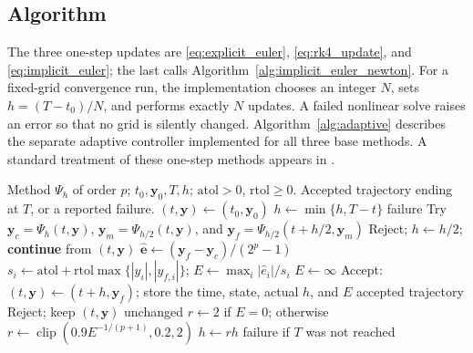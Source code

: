 \documentclass[11pt,a4paper]{article}
\theoremstyle{definition}
\theoremstyle{remark}
\begin{document}
\subsection{Algorithm}
The three one-step updates are \eqref{eq:explicit_euler},
\eqref{eq:rk4_update}, and \eqref{eq:implicit_euler}; the last calls
Algorithm~\ref{alg:implicit_euler_newton}. For a fixed-grid convergence
run, the implementation chooses an integer $N$, sets
$h=(T-t_0)/N$, and performs exactly $N$ updates. A failed nonlinear
solve raises an error so that no grid is silently changed.
Algorithm~\ref{alg:adaptive} describes the separate adaptive
controller implemented for all three base methods. A standard
treatment of these one-step methods appears in \cite{hairer1993}.

\begin{algorithm}[htbp]
\caption{Step-doubling adaptive integration}
\label{alg:adaptive}
\footnotesize
\begin{algorithmic}[1]
\Require Method $\Psi_h$ of order $p$; $t_0,\mathbf y_0,T,h$;
  $\mathrm{atol}>0$, $\mathrm{rtol}\geq0$.
\Ensure Accepted trajectory ending at $T$, or a reported failure.
\State $(t,\mathbf y)\gets(t_0,\mathbf y_0)$
    \State $h\gets\min\{h,T-t\}$
        \State \Return failure
    \EndIf
    \State Try $\mathbf y_c=\Psi_h(t,\mathbf y)$,
      $\mathbf y_m=\Psi_{h/2}(t,\mathbf y)$, and
      $\mathbf y_f=\Psi_{h/2}(t+h/2,\mathbf y_m)$
        \State Reject; $h\gets h/2$; \textbf{continue} from $(t,\mathbf y)$
    \EndIf
    \State $\widehat{\mathbf e}\gets
      (\mathbf y_f-\mathbf y_c)/(2^p-1)$
    \State $s_i\gets \mathrm{atol}+
      \mathrm{rtol}\max\{|y_i|,|y_{f,i}|\}$;
      $E\gets\max_i|\widehat e_i|/s_i$
        \State $E\gets\infty$
    \EndIf
        \State Accept: $(t,\mathbf y)\gets(t+h,\mathbf y_f)$;
          store the time, state, actual $h$, and $E$
            \State \Return accepted trajectory
        \EndIf
    \Else
        \State Reject; keep $(t,\mathbf y)$ unchanged
    \EndIf
    \State $r\gets 2$ if $E=0$; otherwise
      $r\gets\operatorname{clip}(0.9E^{-1/(p+1)},0.2,2)$
    \State $h\gets rh$
\EndWhile
\State \Return failure if $T$ was not reached
\end{algorithmic}
\end{algorithm}
\end{document}
